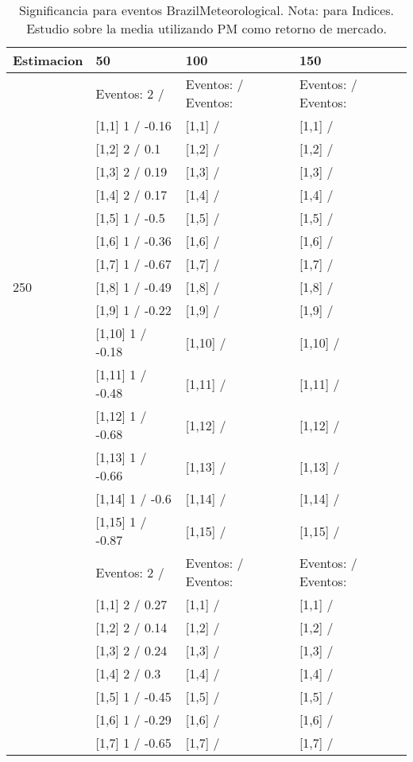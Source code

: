 \begin{table}

\caption{Significancia para eventos BrazilMeteorological. Nota: para Indices. Estudio sobre la media utilizando PM como retorno de mercado.}
\centering
\begin{tabular}[t]{llll}
\toprule
Estimacion & 50 & 100 & 150\\
\midrule
 & Eventos:  2 / & Eventos:   / Eventos: & Eventos:   / Eventos:\\
 & {}[1,1] 1  / -0.16 & {}[1,1]  / & {}[1,1]  /\\
 & {}[1,2] 2  / 0.1 & {}[1,2]  / & {}[1,2]  /\\
 & {}[1,3] 2  / 0.19 & {}[1,3]  / & {}[1,3]  /\\
 & {}[1,4] 2  / 0.17 & {}[1,4]  / & {}[1,4]  /\\
\addlinespace
 & {}[1,5] 1  / -0.5 & {}[1,5]  / & {}[1,5]  /\\
 & {}[1,6] 1  / -0.36 & {}[1,6]  / & {}[1,6]  /\\
 & {}[1,7] 1  / -0.67 & {}[1,7]  / & {}[1,7]  /\\
250 & {}[1,8] 1  / -0.49 & {}[1,8]  / & {}[1,8]  /\\
 & {}[1,9] 1  / -0.22 & {}[1,9]  / & {}[1,9]  /\\
\addlinespace
 & {}[1,10] 1  / -0.18 & {}[1,10]  / & {}[1,10]  /\\
 & {}[1,11] 1  / -0.48 & {}[1,11]  / & {}[1,11]  /\\
 & {}[1,12] 1  / -0.68 & {}[1,12]  / & {}[1,12]  /\\
 & {}[1,13] 1  / -0.66 & {}[1,13]  / & {}[1,13]  /\\
 & {}[1,14] 1  / -0.6 & {}[1,14]  / & {}[1,14]  /\\
\addlinespace
 & {}[1,15] 1  / -0.87 & {}[1,15]  / & {}[1,15]  /\\
 & Eventos:  2 / & Eventos:   / Eventos: & Eventos:   / Eventos:\\
 & {}[1,1] 2  / 0.27 & {}[1,1]  / & {}[1,1]  /\\
 & {}[1,2] 2  / 0.14 & {}[1,2]  / & {}[1,2]  /\\
 & {}[1,3] 2  / 0.24 & {}[1,3]  / & {}[1,3]  /\\
\addlinespace
 & {}[1,4] 2  / 0.3 & {}[1,4]  / & {}[1,4]  /\\
 & {}[1,5] 1  / -0.45 & {}[1,5]  / & {}[1,5]  /\\
 & {}[1,6] 1  / -0.29 & {}[1,6]  / & {}[1,6]  /\\
 & {}[1,7] 1  / -0.65 & {}[1,7]  / & {}[1,7]  /\\

\end{tabular}
\end{table}

